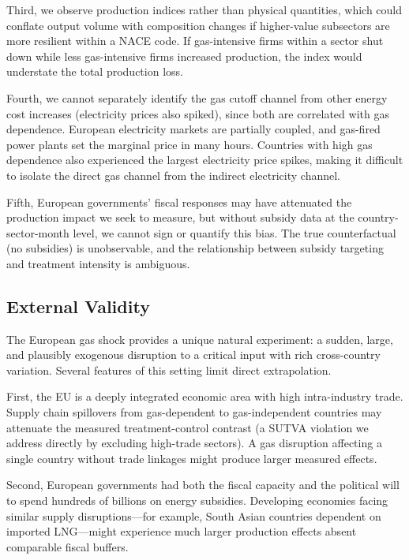 \documentclass[12pt]{article}
\begin{document}
Third, we observe production indices rather than physical quantities, which could conflate output volume with composition changes if higher-value subsectors are more resilient within a NACE code. If gas-intensive firms within a sector shut down while less gas-intensive firms increased production, the index would understate the total production loss.

Fourth, we cannot separately identify the gas cutoff channel from other energy cost increases (electricity prices also spiked), since both are correlated with gas dependence. European electricity markets are partially coupled, and gas-fired power plants set the marginal price in many hours. Countries with high gas dependence also experienced the largest electricity price spikes, making it difficult to isolate the direct gas channel from the indirect electricity channel.

Fifth, European governments' fiscal responses may have attenuated the production impact we seek to measure, but without subsidy data at the country-sector-month level, we cannot sign or quantify this bias. The true counterfactual (no subsidies) is unobservable, and the relationship between subsidy targeting and treatment intensity is ambiguous.

\subsection{External Validity}

The European gas shock provides a unique natural experiment: a sudden, large, and plausibly exogenous disruption to a critical input with rich cross-country variation. Several features of this setting limit direct extrapolation.

First, the EU is a deeply integrated economic area with high intra-industry trade. Supply chain spillovers from gas-dependent to gas-independent countries may attenuate the measured treatment-control contrast (a SUTVA violation we address directly by excluding high-trade sectors). A gas disruption affecting a single country without trade linkages might produce larger measured effects.

Second, European governments had both the fiscal capacity and the political will to spend hundreds of billions on energy subsidies. Developing economies facing similar supply disruptions---for example, South Asian countries dependent on imported LNG---might experience much larger production effects absent comparable fiscal buffers.
\end{document}

